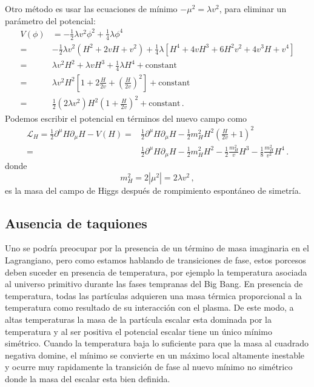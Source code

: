 \begin{frame}
Otro método es usar las ecuaciones de mínimo $-\mu^2=\lambda v^2$, para eliminar un parámetro del potencial:
\begin{align}
  V(\phi)&=-\tfrac{1}{2}\lambda v^2\phi^2+\tfrac{1}{4}\lambda\phi^4\nonumber\\
  =&-\tfrac{1}{2}\lambda v^2 \left(H^2+2vH+v^2\right)+\tfrac{1}{4}\lambda\left[H^4+4vH^3+6H^2v^2+4v^3H+v^4\right]\nonumber\\
  =&\lambda v^2H^2+\lambda vH^3+\tfrac{1}{4}\lambda H^4+\text{constant} \nonumber\\
  =&\lambda v^2 H^2 \left[1 + 2\frac{H}{2v} + \left( \frac{H}{2v} \right)^2\right]+\text{constant} \nonumber\\
    =&\frac{1}{2}\left( 2\lambda v^2 \right) H^2 \left(1+\frac{H}{2v}\right)^2+\text{constant} \,.
\end{align}
Podemos escribir el potencial en términos del  nuevo campo como
\begin{align}
\label{eq:higgspot}
  \mathcal{L}_H=\tfrac{1}{2}\partial^\mu H\partial_\mu H- V(H)
  =&\frac{1}{2}\partial^\mu H\partial_\mu H
     -\frac{1}{2}m_H^2 H^2\left( \frac{H}{2v}+ 1 \right)^2\nonumber\\
  =&\frac{1}{2}\partial^\mu H\partial_\mu H-\frac{1}{2}m_H^2H^2-\frac{1}{2}\frac{m_H^2}{v}H^3-\frac{1}{8}\frac{m_H^2}{v^2} H^4 
\,.
\end{align}
donde
\begin{equation}
\label{eq:higgsmass}
  m_H^2=2\left|\mu^2\right|=2\lambda v^2\,,
\end{equation}
es la masa del campo de Higgs después de rompimiento espontáneo de simetría.
\end{frame}
\subsection{Ausencia de taquiones}

Uno se podría preocupar por la presencia de un término de masa
imaginaria en el Lagrangiano, pero como estamos hablando de
transiciones de fase, estos porcesos deben suceder en presencia de
temperatura, por ejemplo la temperatura asociada al universo primitivo
durante las fases tempranas del Big Bang. En presencia de temperatura,
todas las partículas adquieren una masa térmica proporcional a la
temperatura como resultado de su interacción con el plasma. De este
modo, a altas temperaturas la masa de la partícula escalar esta
dominada por la temperatura y al ser positiva el potencial escalar
tiene un único mínimo simétrico. Cuando la temperatura baja lo
suficiente para que la masa al cuadrado negativa domine, el mínimo se
convierte en un máximo local altamente inestable y ocurre muy
rapidamente la transición de fase al nuevo mínimo no simétrico donde
la masa del escalar esta bien definida.

